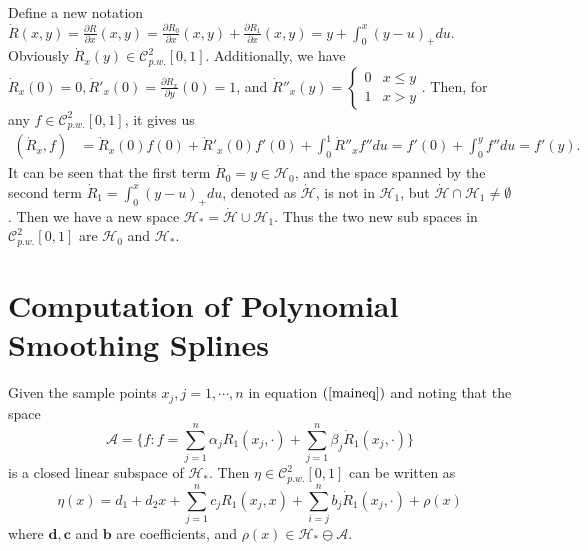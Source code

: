 Define a new notation $\dot{R}(x,y)=\frac{\partial R}{\partial x}(x,y)=\frac{\partial R_0}{\partial x}(x,y)+\frac{\partial R_1}{\partial x}(x,y)=y+\int_0^x(y-u)_+du$. Obviously $\dot{R}_x(y) \in \mathcal{C}_{p.w.}^{2}[0,1]$. Additionally, we have $\dot{R}_x(0)=0, \dot{R}'_x(0)=\frac{\partial \dot{R}_x}{\partial y}(0)=1$, and $ \dot{R}''_x(y)=\begin{cases}
0 & x\leq y \\ 1 & x>y \end{cases}$. Then, for any $f\in \mathcal{C}_{p.w.}^{2}[0,1]$, it gives us 
\begin{align*}
(\dot{R}_x,f) &=\dot{R}_x(0)f(0)+\dot{R}'_x(0)f'(0)+\int_0^1\dot{R}''_x f''	 du=f'(0)+\int_0^y f''du=f'(y).
\end{align*}
It can be seen that the first term $\dot{R}_0=y\in \mathcal{H}_0$, and the space spanned by the second term  $\dot{R}_1=\int_0^x(y-u)_+du$, denoted as $\mathcal{\dot{H}}$, is not in $\mathcal{H}_1$, but $\mathcal{\dot{H}} \cap \mathcal{H}_1\neq \emptyset$. Then we have a new space $\mathcal{H}_*=\mathcal{\dot{H}} \cup \mathcal{H}_1$. Thus the two new sub spaces in $\mathcal{C}_{p.w.}^2[0,1]$ are $\mathcal{H}_0$ and $\mathcal{H}_*$.


\section{Computation of Polynomial Smoothing Splines}

Given the sample points $x_j, j=1, \cdots, n$ in equation $(\ref{maineq})$ and noting that the space
\begin{equation}
\mathcal{A}=\{f: f=\sum_{j=1}^{n}\alpha_jR_1(x_j,\cdot)+\sum_{j=1}^{n}\beta_j\dot{R}_1(x_j,\cdot)\} 
\end{equation}
is a closed linear subspace of $\mathcal{H}_*$. Then $\eta \in \mathcal{C}_{p.w.}^2[0,1]$ can be written as
\begin{equation}\label{etaeq}
\eta(x)=d_1+d_2x+\sum_{j=1}^{n}c_jR_1(x_j,x)+\sum_{i=j}^{n}b_j\dot{R}_1(x_j,\cdot) +\rho(x)
\end{equation}
where $\mathbf{d},\mathbf{c}$ and $\mathbf{b}$ are coefficients, and $\rho(x) \in \mathcal{H}_* \ominus \mathcal{A}$. 

